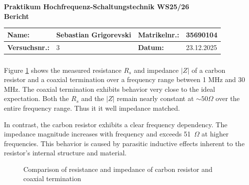 \documentclass[a4paper,12pt]{article}
\begin{document}
	
	\begin{center}
		{\LARGE \textbf{Praktikum Hochfrequenz-Schaltungstechnik WS25/26}} \\[1em]
		{\large  \textbf{Bericht}} \\[0.5em]
	\end{center}
	
\begin{center}
	\begin{tabular}{|l|p{4cm}|l|p{4cm}|}
		\hline
		\textbf{Name:} &  Sebastian Grigorevski & \textbf{Matrikelnr.:} &  35690104 \\
		\hline
		\textbf{Versuchsnr.:} & 3 & \textbf{Datum:} & 23.12.2025 \\
		\hline
	\end{tabular}
\end{center}
	
	\vspace{1cm}
	\setcounter{section}{3}  %
	\setcounter{subsection}{5}  %
	\setcounter{subsubsection}{0}  %

	\subsubsection{}
	Figure \ref{fig:resistors} shows the measured resistance $R_s$ and impedance $|Z|$ of a carbon resistor and a coaxial termination over a frequency range between 1 MHz and 30 MHz.
	The coaxial termination exhibits behavior very close to the ideal expectation. Both the $R_s$ and the $|Z|$ remain nearly constant at $\sim 50 \Omega$ over the entire frequency range. Thus it it well impedance matched.
	
	In contrast, the carbon resistor exhibits a clear frequency dependency. The impedance magnitude increases with frequency and exceeds 51~$\Omega$ at higher frequencies. This behavior is caused by parasitic inductive effects inherent to the resistor’s internal structure and material.
	
	\begin{figure}[H]
		\centering
		
		\caption{Comparison of resistance and impedance of carbon resistor and coaxial termination}
		\label{fig:resistors}
	\end{figure}


	\subsubsection{}
	
\end{document}
